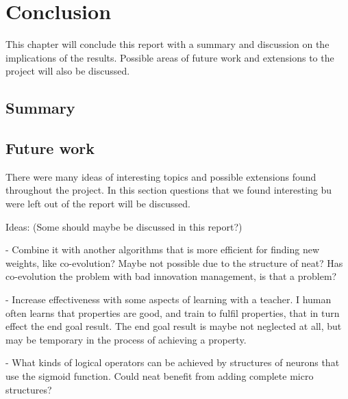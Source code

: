 \chapter{Conclusion}

This chapter will conclude this report with a summary and discussion on the implications of the results. Possible areas of future work and extensions to the project will also be discussed.

\section{Summary}


\section{Future work}


There were many ideas of interesting topics and possible extensions found throughout the project. In this section questions that we found interesting bu were left out of the report will be discussed. 



Ideas: (Some should maybe be discussed in this report?)

- Combine it with another algorithms that is more efficient for finding new weights, like co-evolution? Maybe not possible due to the structure of neat? Has co-evolution the problem with bad innovation management, is that a problem?

- Increase effectiveness with some aspects of learning with a teacher. I human often learns that properties are good, and train to fulfil properties, that in turn effect the end goal result. The end goal result is maybe not neglected at all, but may be temporary in the process of achieving a property.

- What kinds of logical operators can be achieved by structures of neurons that use the sigmoid function. Could neat benefit from adding complete micro structures?
